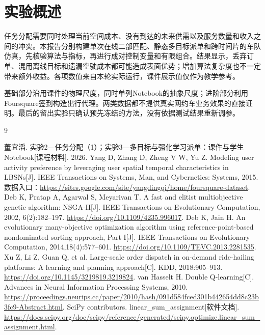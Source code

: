 \documentclass[11pt,a4paper]{article}
\begin{document}
\section*{实验概述}
任务分配需要同时处理当前空间成本、没有到达的未来供需以及服务数量和收入之间的冲突。本报告分别构建单次在线二部匹配、静态多目标派单和跨时间片的车队仿真，先核验算法与指标，再进行成对控制变量和有限组合。结果显示，丢弃订单、混用离线目标和遗漏空驶成本都可能造成表面优势；增加算法复杂度也不一定带来额外收益。各项数值来自本轮实际运行，课件展示值仅作为教学参考。

基础部分沿用课件的物理尺度，同时单列Notebook的抽象尺度；进阶部分利用Foursquare签到构造出行代理\cite{teacher}。两类数据都不提供真实网约车业务效果的直接证明。最后的留出实验只确认预先冻结的方法，没有依据测试结果重新调参。
\tableofcontents\clearpage{}

\nextchapter
\nextchapter
\nextchapter
\nextchapter
\FloatBarrier
\begingroup\small
\begin{thebibliography}{9}
 董宜滔. 实验2—任务分配（1）；实验3—多目标与强化学习派单：课件与学生Notebook[课程材料]. 2026.
 Yang D, Zhang D, Zheng V W, Yu Z. Modeling user activity preference by leveraging user spatial temporal characteristics in LBSNs[J]. IEEE Transactions on Systems, Man, and Cybernetics: Systems, 2015. 数据入口：\url{https://sites.google.com/site/yangdingqi/home/foursquare-dataset}.
 Deb K, Pratap A, Agarwal S, Meyarivan T. A fast and elitist multiobjective genetic algorithm: NSGA-II[J]. IEEE Transactions on Evolutionary Computation, 2002, 6(2):182--197. \url{https://doi.org/10.1109/4235.996017}.
 Deb K, Jain H. An evolutionary many-objective optimization algorithm using reference-point-based nondominated sorting approach, Part I[J]. IEEE Transactions on Evolutionary Computation, 2014,18(4):577--601. \url{https://doi.org/10.1109/TEVC.2013.2281535}.
 Xu Z, Li Z, Guan Q, et al. Large-scale order dispatch in on-demand ride-hailing platforms: A learning and planning approach[C]. KDD, 2018:905--913. \url{https://doi.org/10.1145/3219819.3219824}.
 van Hasselt H. Double Q-learning[C]. Advances in Neural Information Processing Systems, 2010. \url{https://proceedings.neurips.cc/paper/2010/hash/091d584fced301b442654dd8c23b3fc9-Abstract.html}.
 SciPy contributors. linear\_sum\_assignment[软件文档]. \url{https://docs.scipy.org/doc/scipy/reference/generated/scipy.optimize.linear_sum_assignment.html}.
\end{thebibliography}\endgroup
\nextchapter\appendix
\end{document}
